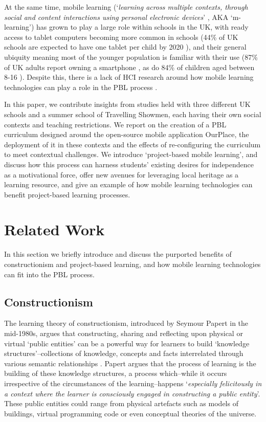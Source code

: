 \documentclass[,hyphens]{sigchi}
\begin{document}
At the same time, mobile learning (`\textit{learning across multiple contexts, through social and content interactions using personal electronic devices}' \cite{Crompton2013}, AKA `m-learning') has grown to play a large role within schools in the UK, with ready access to tablet computers becoming more common in schools (44\% of UK schools are expected to have one tablet per child by 2020 \cite{BritishEducationalSuppliersAssociation2015}), and their general ubiquity meaning most of the younger population is familiar with their use (87\% of UK adults report owning a smartphone \cite{Statistica2018}, as do 84\% of children aged between 8-16 \cite{Statistica2018a}). Despite this, there is a lack of HCI research around how mobile learning technologies can play a role in the PBL process \cite{Chan2015}.

In this paper, we contribute insights from studies held with three different UK schools and a summer school of Travelling Showmen, each having their own social contexts and teaching restrictions. We report on the creation of a PBL curriculum designed around the open-source mobile application OurPlace, the deployment of it in these contexts and the effects of re-configuring the curriculum to meet contextual challenges. We introduce `project-based mobile learning', and discuss how this process can harness students' existing desires for independence as a motivational force, offer new avenues for leveraging local heritage as a learning resource, and give an example of how mobile learning technologies can benefit project-based learning processes.

\section{Related Work}
In this section we briefly introduce and discuss the purported benefits of constructionism and project-based learning, and how mobile learning technologies can fit into the PBL process.

\subsection{Constructionism}
The learning theory of constructionism, introduced by Seymour Papert in the mid-1980s, argues that constructing, sharing and reflecting upon physical or virtual `public entities' can be a powerful way for learners to build `knowledge structures'--collections of knowledge, concepts and facts interrelated through various semantic relationships \cite{PapertSeymourandHarel1991a}. Papert argues that the process of learning is the building of these knowledge structures, a process which--while it occurs irrespective of the circumstances of the learning--happens `\textit{especially felicitously in a context where the learner is consciously engaged in constructing a public entity}'. These public entities could range from physical artefacts such as models of buildings, virtual programming code or even conceptual theories of the universe. 
\end{document}

